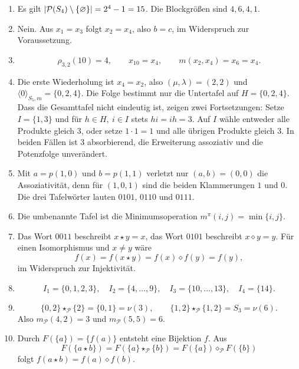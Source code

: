 \documentclass[main.tex]{subfiles}
\begin{document}
\begin{enumerate}
  \item Es gilt \(|\mathcal{P}(S_4)\setminus\{\varnothing\}|=2^4-1=15\).  Die Blockgrößen sind
    \(4,6,4,1\).

  \item Nein.  Aus \(x_1=x_3\) folgt \(x_2=x_4\), also \(b=c\), im
    Widerspruch zur Voraussetzung.

  \item
    \[
      \rho_{3,2}(10)=4,\qquad x_{10}=x_4,\qquad
      m(x_2,x_4)=x_6=x_4.
    \]

  \item Die erste Wiederholung ist \(x_4=x_2\), also
    \((\mu,\lambda)=(2,2)\) und
    \(\langle0\rangle_{S_5,m}=\{0,2,4\}\).  Die Folge bestimmt nur die Untertafel auf
    \(H=\{0,2,4\}\).  Dass die Gesamttafel nicht eindeutig ist, zeigen zwei
    Fortsetzungen: Setze \(I=\{1,3\}\) und für \(h\in H,\ i\in I\) stets
    \(hi=ih=3\).  Auf \(I\) wähle entweder alle Produkte gleich \(3\), oder
    setze \(1\cdot1=1\) und alle übrigen Produkte gleich \(3\).  In beiden
    Fällen ist \(3\) absorbierend, die Erweiterung assoziativ und die
    Potenzfolge unverändert.

  \item Mit \(a=p(1,0)\) und \(b=p(1,1)\) verletzt nur
    \((a,b)=(0,0)\) die Assoziativität, denn für \((1,0,1)\) sind die beiden
    Klammerungen \(1\) und \(0\).  Die drei Tafelwörter lauten
    \(0101\), \(0110\) und \(0111\).

  \item Die umbenannte Tafel ist die Minimumsoperation
    \(m^\pi(i,j)=\min\{i,j\}\).

  \item Das Wort \(0011\) beschreibt \(x\star y=x\), das Wort \(0101\)
    beschreibt \(x\diamond y=y\).  Für einen Isomorphismus und
    \(x\neq y\) wäre
    \[
      f(x)=f(x\star y)=f(x)\diamond f(y)=f(y),
    \]
    im Widerspruch zur Injektivität.

  \item
    \[
      I_1=\{0,1,2,3\},\quad
      I_2=\{4,\ldots,9\},\quad
      I_3=\{10,\ldots,13\},\quad
      I_4=\{14\}.
    \]

  \item
    \[
      \{0,2\}\star_{\mathcal P}\{2\}=\{0,1\}=\nu(3),
      \qquad
      \{1,2\}\star_{\mathcal P}\{1,2\}=S_3=\nu(6).
    \]
    Also \(m_{\mathcal P}(4,2)=3\) und
    \(m_{\mathcal P}(5,5)=6\).

  \item Durch \(F(\{a\})=\{f(a)\}\) entsteht eine Bijektion \(f\).  Aus
    \[
      F(\{a\star b\})
      =
      F(\{a\}\star_{\mathcal P}\{b\})
      =
      F(\{a\})\diamond_{\mathcal P}F(\{b\})
    \]
    folgt \(f(a\star b)=f(a)\diamond f(b)\).


\end{enumerate}
\end{document}
